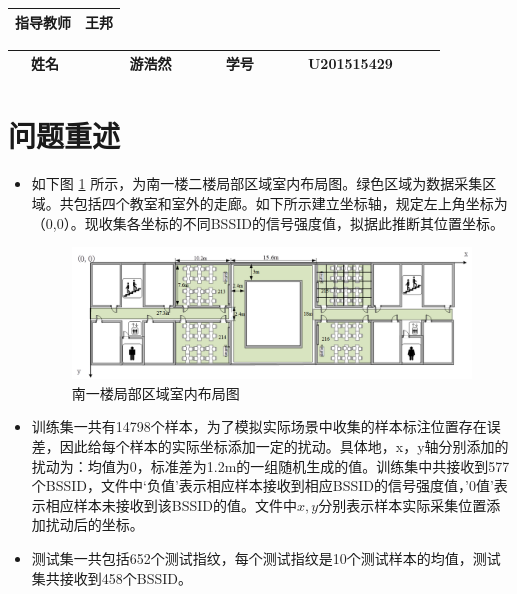 \documentclass[UTF-8, a4paper, 10pt]{article}
\numberwithin{equation}{section}
\begin{document}
\begin{titlepage}
\begin{center}
\begin{table}[!hbp]
\begin{tabular}{|c|c|}
     		\hline
     		指导教师 & 王邦 \\
     		\hline
     		\end{tabular}     		
       \end{table}
       \vspace{2cm}
      \begin{table}[htbp]
      \centering
      \renewcommand\arraystretch{1.5}
     	\begin{tabular}{|c|c|c|c|}
     		\hline
            \qquad ~~姓名~~~~~  & \qquad ~~游浩然~~~~~  & \qquad 学号~~~~~ & \qquad U201515429~~~~~ \\
     		\hline
     		\end{tabular}
       \end{table}
       \date{2018年5月29日}
     \end{center}
\end{titlepage}

\section{问题重述}
\begin{itemize}
  \item 如下图 \ref{nanyi} 所示，为南一楼二楼局部区域室内布局图。绿色区域为数据采集区域。共包括四个教室和室外的走廊。如下所示建立坐标轴，规定左上角坐标为（0,0）。现收集各坐标的不同BSSID的信号强度值，拟据此推断其位置坐标。
      \begin{figure}[!htbp]
        \centering
        \includegraphics[width=12cm]{nanyi.png}
        \caption{南一楼局部区域室内布局图}\label{nanyi}
      \end{figure}
  \item 训练集一共有14798个样本，为了模拟实际场景中收集的样本标注位置存在误差，因此给每个样本的实际坐标添加一定的扰动。具体地，x，y轴分别添加的扰动为：均值为0，标准差为1.2m的一组随机生成的值。训练集中共接收到577个BSSID，文件中‘负值’表示相应样本接收到相应BSSID的信号强度值，'0值'表示相应样本未接收到该BSSID的值。文件中$x,y$分别表示样本实际采集位置添加扰动后的坐标。
  \item 测试集一共包括652个测试指纹，每个测试指纹是10个测试样本的均值，测试集共接收到458个BSSID。
\end{itemize}
\end{document}
